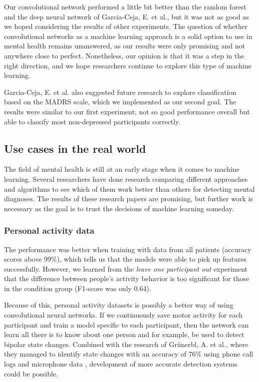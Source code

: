 Our convolutional network performed a little bit better than the random forest and the deep neural network of Garcia-Ceja, E. et al., but it was not as good as we hoped considering the results of other experiments. The question of whether convolutional networks as a machine learning approach is a solid option to use in mental health remains unanswered, as our results were only promising and not anywhere close to perfect. Nonetheless, our opinion is that it was a step in the right direction, and we hope researchers continue to explore this type of machine learning.

Garcia-Ceja, E. et al. also suggested future research to explore classification based on the MADRS scale, which we implemented as our second goal. The results were similar to our first experiment; not so good performance overall but able to classify most non-depressed participants correctly. 

\subsection{Use cases in the real world}

The field of mental health is still at an early stage when it comes to machine learning. Several researchers have done research comparing different approaches and algorithms to see which of them work better than others for detecting mental diagnoses. The results of these research papers are promising, but further work is necessary as the goal is to trust the decisions of machine learning someday. 

\subsubsection{Personal activity data}
The performance was better when training with data from all patients (accuracy scores above 99\%), which tells us that the models were able to pick up features successfully. However, we learned from the \textit{leave one participant out} experiment that the difference between people's activity behavior is too significant for those in the condition group (F1-score was only 0.64). 

Because of this, personal activity datasets is possibly a better way of using convolutional neural networks. If we continuously save motor activity for each participant and train a model specific to each participant, then the network can learn all there is to know about one person and for example, be used to detect bipolar state changes. Combined with the research of Grünerbl, A. et al., where they managed to identify state changes with an accuracy of 76\% using phone call logs and microphone data \cite{grunerbl_smartphone_bipolar}, development of more accurate detection systems could be possible.


